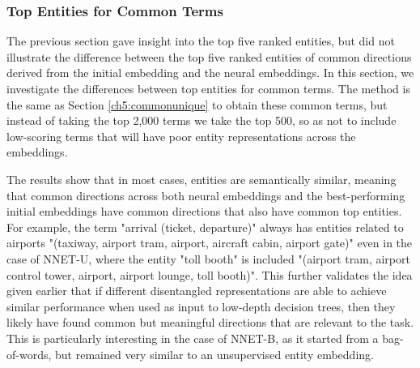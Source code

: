 \subsubsection{Top Entities for Common Terms}\label{ch5:commonterms}

The previous section gave insight into the  top five ranked entities, but did not illustrate the difference between the top five ranked entities  of  common directions derived from  the initial embedding and the neural   embeddings.  In this section, we investigate the differences between top entities for common terms. The method is the same as Section \ref{ch5:commonunique} to obtain these common terms, but instead of taking the top 2,000 terms we take the top 500, so as not to include low-scoring terms that will have poor entity representations across the embeddings. 

The results show that in most cases, entities are semantically similar, meaning that common directions across both neural embeddings and the best-performing initial embeddings have common directions that also have common top entities. For example, the term "arrival (ticket, departure)" always has entities related to airports "(taxiway, airport tram, airport, aircraft cabin, airport gate)" even in the case of NNET-U, where the entity "toll booth" is included "(airport tram, airport control tower, airport, airport lounge, toll booth)".  This further validates the idea given earlier that if different disentangled representations are able to achieve similar performance when used as input to low-depth decision trees, then they likely have found common but meaningful directions that are relevant to the task. This is particularly interesting in the case of NNET-B, as it started from a bag-of-words, but remained very similar to an unsupervised entity embedding. %

